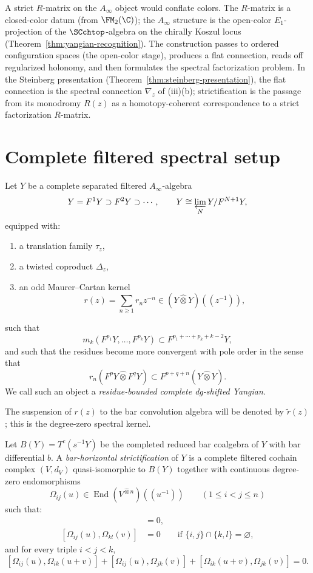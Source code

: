 A strict $R$-matrix on the $A_\infty$ object would conflate colors.
The $R$-matrix is a closed-color datum (from $\FM_2(\C)$); the
$A_\infty$ structure is the open-color $E_1$-projection of the
$\SCchtop$-algebra on the chirally Koszul locus
(Theorem~\ref{thm:yangian-recognition}). The construction passes to
ordered configuration spaces (the open-color stage), produces a flat
connection, reads off regularized holonomy, and then formulates the
spectral factorization problem. In the Steinberg presentation
(Theorem~\ref{thm:steinberg-presentation}), the flat connection is the
spectral connection $\nabla_z$ of (iii)(b); strictification is the
passage from its monodromy $R(z)$ as a homotopy-coherent correspondence
to a strict factorization $R$-matrix.

\section{Complete filtered spectral setup}

\begin{definition}
Let $Y$ be a complete separated filtered $A_\infty$-algebra
\[
Y=F^1Y\supset F^2Y\supset \cdots,
\qquad
Y\cong \varprojlim_N Y/F^{N+1}Y,
\]
equipped with:
\begin{enumerate}
\item a translation family $\tau_z$,
\item a twisted coproduct $\Delta_z$,
\item an odd Maurer--Cartan kernel
\[
r(z)=\sum_{n\ge 1} r_n z^{-n} \in (Y\widehat\otimes Y)((z^{-1})),
\]
\end{enumerate}
such that
\[
m_k(F^{p_1}Y,\dots,F^{p_k}Y)
\subset F^{p_1+\cdots+p_k+k-2}Y,
\]
and such that the residues become more convergent with pole order in the
sense that
\[
r_n(F^pY\widehat\otimes F^qY)
\subset F^{p+q+n}(Y\widehat\otimes Y).
\]
We call such an object a \emph{residue-bounded complete dg-shifted
Yangian}.
\end{definition}

The suspension of $r(z)$ to the bar convolution algebra will be denoted
by $\widetilde r(z)$; this is the degree-zero spectral kernel.

\begin{definition}
Let $B(Y)=T^c(s^{-1}Y)$ be the completed reduced bar coalgebra of $Y$ with
bar differential $b$. A \emph{bar-horizontal strictification} of $Y$
is a complete filtered cochain complex $(V,d_V)$ quasi-isomorphic to
$B(Y)$ together with continuous degree-zero endomorphisms
\[
\Omega_{ij}(u)\in \operatorname{End}(V^{\widehat\otimes n})((u^{-1}))
\qquad (1\le i<j\le n)
\]
such that:
\begin{align*}
[d_V,\Omega_{ij}(u)]&=0,\\
[\Omega_{ij}(u),\Omega_{kl}(v)]&=0
\qquad \text{if }\{i,j\}\cap\{k,l\}=\varnothing,
\end{align*}
and for every triple $i<j<k$,
\[
[\Omega_{ij}(u),\Omega_{ik}(u+v)]
+[\Omega_{ij}(u),\Omega_{jk}(v)]
+[\Omega_{ik}(u+v),\Omega_{jk}(v)] = 0.
\]
\end{definition}

